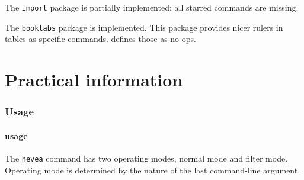 The \texttt{import} package is partially implemented:
all starred commands are missing.

The \texttt{booktabs} package is implemented.
This package provides nicer rulers in tables as specific commands.
\hevea{} defines those as no-ops.




\cutend
\setcounter{section}{0}

\part{\label{practical}Practical information}

\section{Usage}
\subsection{\hevea{} usage}\label{heveausage}
The \texttt{hevea} command has two operating modes, normal mode and
filter mode.
Operating mode is determined by the nature of the last command-line
argument.

